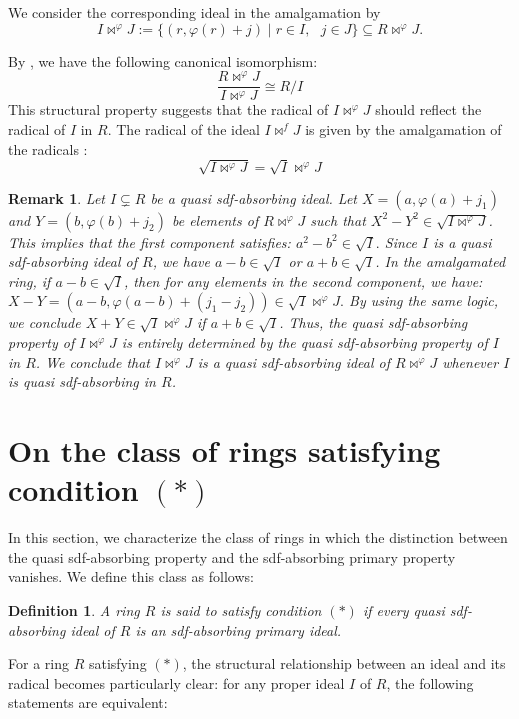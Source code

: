 \documentclass{amsart}%
\newtheorem{definition}{Definition}[section]
\newtheorem{remark}{Remark}[section]
\begin{document}
We consider the corresponding ideal in the amalgamation by
\[
I\bowtie^{\varphi}J:=\{(r,\varphi(r)+j)\mid r\in I,\text{ }j\in J\}\subseteq
R\bowtie^{\varphi}J.
\]


By \cite[Proposition 2.1 (2)]{DAnna2009}, we have the following canonical
isomorphism:
\[
\frac{R\bowtie^{\varphi}J}{I\bowtie^{\varphi}J}\cong R/I
\]
This structural property suggests that the radical of $I\bowtie^{\varphi}J$
should reflect the radical of $I$ in $R$. The radical of the ideal
$I\bowtie^{f}J$ is given by the amalgamation of the radicals \cite[Lemma
9]{AE}:
\[
\sqrt{I\bowtie^{\varphi}J}=\sqrt{I}\bowtie^{\varphi}J
\]


\begin{remark}
Let $I\subsetneq R$ be a quasi sdf-absorbing ideal. Let $X=(a,\varphi
(a)+j_{1})$ and $Y=(b,\varphi(b)+j_{2})$ be elements of $R\bowtie^{\varphi}J$
such that $X^{2}-Y^{2}\in\sqrt{I\bowtie^{\varphi}J}$. This implies that the
first component satisfies: $a^{2}-b^{2}\in\sqrt{I}.$ Since $I$ is a quasi
sdf-absorbing ideal of $R$, we have $a-b\in\sqrt{I}$ or $a+b\in\sqrt{I}$. In
the amalgamated ring, if $a-b\in\sqrt{I}$, then for any elements in the second
component, we have: $X-Y=(a-b,\varphi(a-b)+(j_{1}-j_{2}))\in\sqrt{I}%
\bowtie^{\varphi}J.$ By using the same logic, we conclude $X+Y\in\sqrt
{I}\bowtie^{\varphi}J$ if $a+b\in\sqrt{I}$. Thus, the quasi sdf-absorbing
property of $I\bowtie^{\varphi}J$ is entirely determined by the quasi
sdf-absorbing property of $I$ in $R$. We conclude that $I\bowtie^{\varphi}J$
is a quasi sdf-absorbing ideal of $R\bowtie^{\varphi}J$ whenever $I$ is quasi
sdf-absorbing in $R$.
\end{remark}

\section{On the class of rings satisfying condition $(\ast)$}

In this section, we characterize the class of rings in which the distinction
between the quasi sdf-absorbing property and the sdf-absorbing primary
property vanishes. We define this class as follows:

\begin{definition}
A ring $R$ is said to satisfy condition $(\ast)$ if every quasi sdf-absorbing
ideal of $R$ is an sdf-absorbing primary ideal.
\end{definition}

For a ring $R$ satisfying $(\ast)$, the structural relationship between an
ideal and its radical becomes particularly clear: for any proper ideal $I$ of
$R$, the following statements are equivalent:
\end{document}
